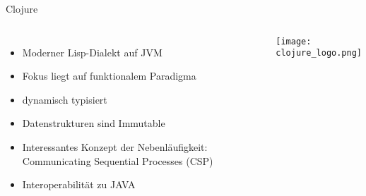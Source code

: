 \documentclass[compress]{beamer}
\begin{document}

\begin{frame}{Clojure}
  \begin{columns}[c]
    \begin{itemize}
      \item Moderner Lisp-Dialekt auf JVM
      \item Fokus liegt auf funktionalem Paradigma
      \item dynamisch typisiert
      \item Datenstrukturen sind Immutable
      \item Interessantes Konzept der Nebenläufigkeit: Communicating Sequential Processes (CSP)
      \item Interoperabilität zu JAVA
    \end{itemize}
    \texttt{[image: clojure\_logo.png]}
  \end{columns}
\end{frame}
\end{document}
